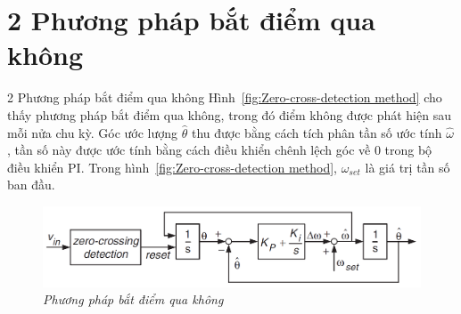 \documentclass[11pt]{beamer}
\renewcommand{\label}[1]{%
			\gdef\sfname{sf:##1}}%
\begin{document}
\section{2 Phương pháp bắt điểm qua không}
	\begin{frame}[t]{2 Phương pháp bắt điểm qua không}
		Hình~\ref{fig:Zero-cross-detection method} cho thấy phương pháp bắt điểm qua không, trong đó điểm không được phát hiện sau mỗi nửa chu kỳ. Góc ước lượng $\hat{\theta}$ thu được bằng cách tích phân tần số ước tính $\hat{\omega}$, tần số này được ước tính bằng cách điều khiển chênh lệch góc về 0 trong bộ điều khiển PI. Trong hình~\ref{fig:Zero-cross-detection method}, $\omega_{set}$ là giá trị tần số ban đầu.
		
		\begin{figure}[h]
			 \includegraphics[width=1\textwidth]{Fig. 1 Zero-cross-detection method.PNG}  
			 \caption{\textit{Phương pháp bắt điểm qua không}}
			 \label{fig:Zero-cross-detection method}
		 \end{figure} 
		
	\end{frame}
\end{document}
